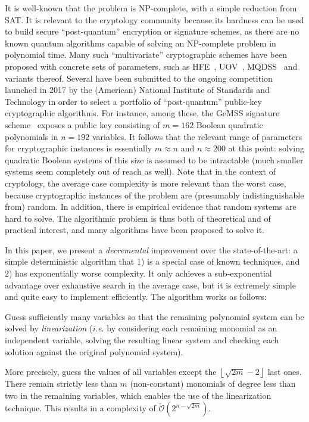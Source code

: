 \documentclass[twoside,leqno]{article}
\newcommand{\bigOsoft}[1]{\ensuremath{\mathcal{\tilde O}\left( #1 \right)} }
\begin{document}
It is well-known that the problem is NP-complete, with a simple reduction from
SAT. It is relevant to the cryptology community because its hardness can be used
to build secure ``post-quantum'' encryption or signature schemes, as there are
no known quantum algorithms capable of solving an NP-complete problem in
polynomial time. Many such ``multivariate'' cryptographic schemes have been
proposed with concrete sets of parameters, such as
\textsf{HFE}~\cite{Patarin96}, \textsf{UOV}~\cite{KipnisPG99},
\textsf{MQDSS}~\cite{ChenHRSS16} and variants thereof. Several have been
submitted to the ongoing competition launched in 2017 by the (American) National
Institute of Standards and Technology in order to select a portfolio of
``post-quantum'' public-key cryptographic algorithms. For instance, among these,
the \textsf{GeMSS} signature scheme~\cite{GeMSS} exposes a public key consisting
of $m=162$ Boolean quadratic polynomials in $n=192$ variables. It follows that
the relevant range of parameters for cryptographic instances is essentially
$m \approx n$ and $n \approx 200$ at this point: solving quadratic Boolean
systems of this size is assumed to be intractable (much smaller systems seem
completely out of reach as well). Note that in the context of cryptology, the
average case complexity is more relevant than the worst case, because
cryptographic instances of the problem are (presumably indistinguishable from)
random. In addition, there is empirical evidence that random systems are hard to
solve. The algorithmic problem is thus both of theoretical and of practical
interest, and many algorithms have been proposed to solve it.

In this paper, we present a \emph{decremental} improvement over the
state-of-the-art: a simple deterministic algorithm that 1) is a special case of
known techniques, and 2) has exponentially worse complexity. It only achieves a
sub-exponential advantage over exhaustive search in the average case, but it is
extremely simple and quite easy to implement efficiently. The algorithm works as
follows:

\begin{framed}
  Guess sufficiently many variables so that the remaining polynomial system can
  be solved by \emph{linearization} (\textit{i.e.} by considering each remaining
  monomial as an independent variable, solving the resulting linear system and
  checking each solution against the original polynomial system).
\end{framed}

More precisely, guess the values of all variables except the
$\left\lfloor \sqrt{2m} - 2 \right\rfloor$ last ones. There remain strictly less
than $m$ (non-constant) monomials of degree less than two in the remaining
variables, which enables the use of the linearization technique. This results in
a complexity of $\bigOsoft{2^{n - \sqrt{2m}}}$.
\end{document}
